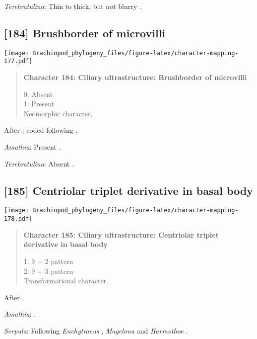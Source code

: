 \documentclass[openany]{book}
\theoremstyle{definition}
\theoremstyle{definition}
\theoremstyle{definition}
\theoremstyle{remark}
\begin{document}
\hypertarget{Terebratulina-coding-183}{}
\emph{Terebratulina}: Thin to thick, but not blurry \citep{Luter1995}.

\subsection*{{[}184{]} Brushborder of
microvilli}\label{brushborder-of-microvilli}

\texttt{[image: Brachiopod\_phylogeny\_files/figure-latex/character-mapping-177.pdf]}

\begin{quote}
\textbf{Character 184: Ciliary ultrastructure: Brushborder of
microvilli}

0: Absent\\
1: Present\\
Neomorphic character.
\end{quote}

After \citet{Lundin2009}; coded following \citet{Smith2012}.

\hypertarget{Amathia-coding-184}{}
\emph{Amathia}: Present \citep{Reed1982}.

\hypertarget{Terebratulina-coding-184}{}
\emph{Terebratulina}: Absent \citep{Luter1995}.

\subsection*{{[}185{]} Centriolar triplet derivative in basal
body}\label{centriolar-triplet-derivative-in-basal-body}

\texttt{[image: Brachiopod\_phylogeny\_files/figure-latex/character-mapping-178.pdf]}

\begin{quote}
\textbf{Character 185: Ciliary ultrastructure: Centriolar triplet
derivative in basal body}

1: 9 + 2 pattern\\
2: 9 + 3 pattern\\
Transformational character.
\end{quote}

After \citet{Lundin2009}.

\hypertarget{Amathia-coding-185}{}
\emph{Amathia}: \citet{Reed1982}.

\hypertarget{Serpula-coding-185}{}
\emph{Serpula}: Following \emph{Enchytraeus} \citep{Reger1967},
\emph{Magelona} \citep{Bartolomaeus1995} and \emph{Harmothoe}
\citep{Holborow1969}.
\end{document}
